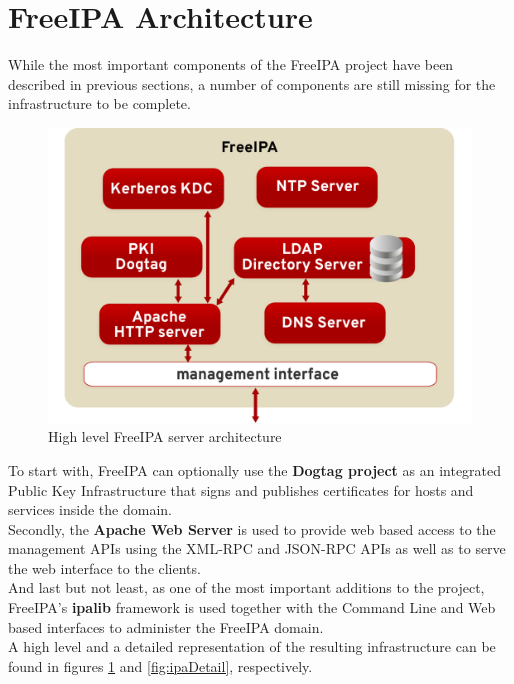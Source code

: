 \FloatBarrier
\section{FreeIPA Architecture}
While the most important components of the FreeIPA project have been described in previous sections, a number of components are still missing for the infrastructure to be complete.

\begin{figure}[!ht]
    \centering
        \includegraphics[scale=0.6]{fig/ipa-architecture}
    \caption{High level FreeIPA server architecture}
    \label{fig:ipaHigh}
\end{figure}

To start with, FreeIPA can optionally use the \textbf{Dogtag project} \cite{certWeb} as an integrated Public Key Infrastructure that signs and publishes certificates for hosts and services inside the domain. \\
Secondly, the \textbf{Apache Web Server} is used to provide web based access to the management APIs using the XML-RPC and JSON-RPC APIs as well as to serve the web interface to the clients. \\
And last but not least, as one of the most important additions to the project, FreeIPA's \textbf{ipalib} framework is used together with the Command Line and Web based interfaces to administer the FreeIPA domain. \\
A high level and a detailed representation of the resulting infrastructure can be found in figures \ref{fig:ipaHigh} and \ref{fig:ipaDetail}, respectively.

